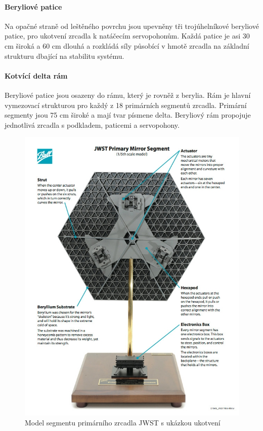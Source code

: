 \documentclass[a4paper,11pt]{article}
\begin{document}
\paragraph{Beryliové patice}
Na opačné straně od leštěného povrchu jsou upevněny tři trojúhelníkové beryliové patice, pro ukotvení zrcadla k natáčecím servopohonům. Každá patice je asi 30 cm široká a 60 cm dlouhá a rozkládá síly působící v hmotě zrcadla na základní strukturu dbající na stabilitu systému.

\paragraph{Kotvící delta rám}
Beryliové patice jsou osazeny do rámu, který je rovněž z berylia. Rám je hlavní vymezovací strukturou pro každý z 18 primárních segmentů zrcadla. Primární segmenty jsou 75 cm široké a mají tvar písmene delta. Beryliový rám propojuje jednotlivá zrcadla s podkladem, paticemi a servopohony.


\begin{figure}[h]
\begin{center}
\includegraphics[width=12cm]{webbRam.jpg}
\caption{Model segmentu primárního zrcadla JWST s ukázkou ukotvení}
\end{center}
\end{figure}
\end{document}
